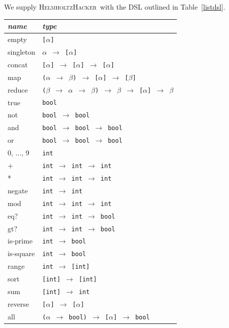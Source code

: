 \documentclass{article}
\newcommand{\system}{\textsc{HelmholtzHacker}~}
\begin{document}
We supply \system with the DSL outlined in Table~\ref{listdsl}.

\begin{table}
\centering
\begin{tabular}{| l | l |}
  \hline
  \emph{name} & \emph{type} \\
  \hline
    empty & \texttt{[$\alpha$]} \\
    singleton & \texttt{$\alpha$ $\rightarrow$ [$\alpha$]} \\
    concat & \texttt{[$\alpha$] $\rightarrow$ [$\alpha$] $\rightarrow$ [$\alpha$]} \\
    map & \texttt{($\alpha$ $\rightarrow$ $\beta$) $\rightarrow$ [$\alpha$] $\rightarrow$ [$\beta$]} \\
    reduce & \texttt{($\beta$ $\rightarrow$ $\alpha$ $\rightarrow$ $\beta$) $\rightarrow$ $\beta$ $\rightarrow$ [$\alpha$] $\rightarrow$ $\beta$} \\
    \hline
    true & \texttt{bool} \\
    not & \texttt{bool $\rightarrow$ bool} \\
    and & \texttt{bool $\rightarrow$ bool $\rightarrow$ bool} \\
    or & \texttt{bool $\rightarrow$ bool $\rightarrow$ bool} \\
    \hline
    0, $\ldots$, 9 & \texttt{int} \\
    + & \texttt{int $\rightarrow$ int $\rightarrow$ int} \\
    * & \texttt{int $\rightarrow$ int $\rightarrow$ int} \\
    negate & \texttt{int $\rightarrow$ int} \\
    mod & \texttt{int $\rightarrow$ int $\rightarrow$ int} \\
    eq? & \texttt{int $\rightarrow$ int $\rightarrow$ bool} \\
    gt? & \texttt{int $\rightarrow$ int $\rightarrow$ bool} \\
    is-prime & \texttt{int $\rightarrow$ bool} \\
    is-square & \texttt{int $\rightarrow$ bool} \\
    range & \texttt{int $\rightarrow$ [int]} \\
    sort & \texttt{[int] $\rightarrow$ [int]} \\
    \hline
    sum & \texttt{[int] $\rightarrow$ int} \\
    reverse & \texttt{[$\alpha$] $\rightarrow$ [$\alpha$]} \\
    all & \texttt{($\alpha$ $\rightarrow$ bool) $\rightarrow$ [$\alpha$] $\rightarrow$ bool} \\

\end{tabular}
\end{table}
\end{document}

